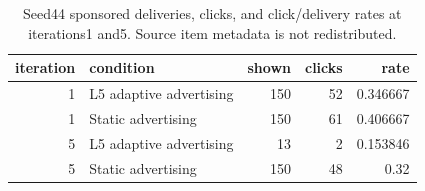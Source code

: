 \begin{table}[htbp!]
\centering
\small
\setlength{\tabcolsep}{3pt}
\renewcommand{\arraystretch}{1.1}
\begin{tabular}{rlrrr}
\hline
iteration & condition & shown & clicks & rate \\
\hline
1 & L5 adaptive advertising & 150 & 52 & 0.346667 \\
1 & Static advertising & 150 & 61 & 0.406667 \\
5 & L5 adaptive advertising & 13 & 2 & 0.153846 \\
5 & Static advertising & 150 & 48 & 0.32 \\
\hline
\end{tabular}
\caption{Seed44 sponsored deliveries, clicks, and click/delivery rates at iterations1 and5. Source item metadata is not redistributed.}
\label{chap:results:tab:rq1_spike_counts}
\end{table}
